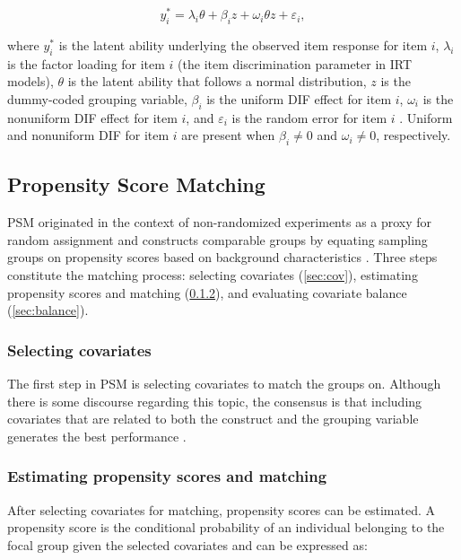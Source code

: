 \documentclass{article}
\begin{document}
\begin{equation} \label{eq:mimic_oneitem}
    y_i^* = \lambda_i\theta + \beta_i z + \omega_i\theta z + \varepsilon_i,
\end{equation}

where $y_i^*$ is the latent ability underlying the observed item response for item $i$, $\lambda_i$ is the factor loading for item $i$ (the item discrimination parameter in IRT models), $\theta$ is the latent ability that follows a normal distribution, $z$ is the dummy-coded grouping variable, $\beta_i$ is the uniform DIF effect for item $i$, $\omega_i$ is the nonuniform DIF effect for item $i$, and $\varepsilon_i$ is the random error for item $i$ \citep{bulut2017detecting}. Uniform and nonuniform DIF for item $i$ are present when $\beta_i \neq 0$ and $\omega_i \neq 0$, respectively. 

\subsection{Propensity Score Matching} \label{sec:psm}

PSM originated in the context of non-randomized experiments as a proxy for random assignment and constructs comparable groups by equating sampling groups on propensity scores based on background characteristics \citep{rosenbaum1983central}. Three steps constitute the matching process: selecting covariates (\ref{sec:cov}), estimating propensity scores and matching (\ref{sec:est_psm}), and evaluating covariate balance (\ref{sec:balance}). 

\subsubsection{Selecting covariates} \label{sec:select_cov}

The first step in PSM is selecting covariates to match the groups on. Although there is some discourse regarding this topic, the consensus is that including covariates that are related to both the construct and the grouping variable generates the best performance \citep{stuart2010matching}. 

\subsubsection{Estimating propensity scores and matching} \label{sec:est_psm}

After selecting covariates for matching, propensity scores can be estimated. A propensity score is the conditional probability of an individual belonging to the focal group given the selected covariates and can be expressed as:
\end{document}
